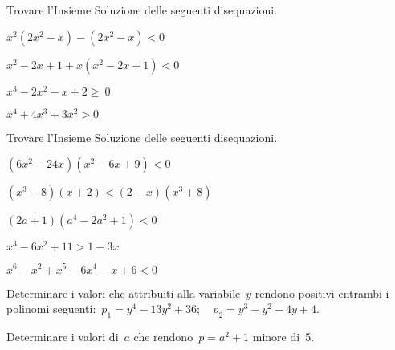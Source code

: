 \begin{esercizio}[\Ast]
 \label{ese:21.48}
Trovare l'Insieme Soluzione delle seguenti disequazioni.
\begin{multicols}{2}
 \begin{enumeratea}
 \item \(x^{2}(2x^{2}-x)-(2x^{2}-x)<0\)
\item \(x^{2}-2x+1+x(x^{2}-2x+1)<0\)
\item \(x^{3}-2x^{2}-x+2\ge~0\)
\item \(x^{4}+4x^{3}+3x^{2}>0\)
\end{enumeratea}
\end{multicols}
\end{esercizio}

\begin{esercizio}[\Ast]
 \label{ese:21.49}
Trovare l'Insieme Soluzione delle seguenti disequazioni.
\begin{multicols}{2}
 \begin{enumeratea}
 \item \((6x^{2}-24x)(x^{2}-6x+9)<0\)
\item \((x^{3}-8)(x+2)<(2-x)(x^{3}+8)\)
\item \((2a+1)(a^{4}-2a^{2}+1)<0\)
\item \(x^{3}-6x^{2}+11>1-3x\)
\item \(x^{6}-x^{2}+x^{5}-6x^{4}-x+6<0\)
\end{enumeratea}
\end{multicols}
\end{esercizio}

\begin{esercizio}[\Ast]
 \label{ese:21.50}
 Determinare i valori che attribuiti alla variabile~\(y\) rendono positivi
entrambi i polinomi
seguenti:~\(p_{1}=y^{4}-13y^{2}+36;\quad p_{2}=y^{3}-y^{2}-4y+4.\)
\end{esercizio}

\begin{esercizio}[\Ast]
 \label{ese:21.51}
 Determinare i valori di~\(a\) che rendono~\(p=a^{2}+1\) minore di~5.
\end{esercizio}

